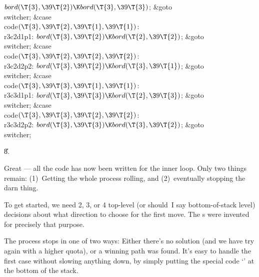 ${}\\{bord}(\T{3},\39\T{2})\K\\{bord}(\T{3},\39\T{3}){}$;\5
\&{goto} \\{switcher};\6
\4\&{case} \\{code}${}(\T{3},\39\T{2},\39\T{1},\39\T{1}){}$:\5
\\{r3c2d1p1}:\5
${}\\{bord}(\T{3},\39\T{2})\K\\{bord}(\T{2},\39\T{2}){}$;\5
\&{goto} \\{switcher};\6
\4\&{case} \\{code}${}(\T{3},\39\T{2},\39\T{2},\39\T{2}){}$:\5
\\{r3c2d2p2}:\5
${}\\{bord}(\T{3},\39\T{2})\K\\{bord}(\T{3},\39\T{1}){}$;\5
\&{goto} \\{switcher};\6
\4\&{case} \\{code}${}(\T{3},\39\T{3},\39\T{1},\39\T{1}){}$:\5
\\{r3c3d1p1}:\5
${}\\{bord}(\T{3},\39\T{3})\K\\{bord}(\T{2},\39\T{3}){}$;\5
\&{goto} \\{switcher};\6
\4\&{case} \\{code}${}(\T{3},\39\T{3},\39\T{2},\39\T{2}){}$:\5
\\{r3c3d2p2}:\5
${}\\{bord}(\T{3},\39\T{3})\K\\{bord}(\T{3},\39\T{2}){}$;\5
\&{goto} \\{switcher};\par
\U8.\fi

Great --- all the code has now been written for
the inner loop.
Only two things remain: (1)~Getting the whole process rolling, and
(2)~eventually stopping the darn thing.

To get started, we need 2, 3, or 4 top-level (or should~I say
bottom-of-stack level) decisions about what direction to choose for the
first move. The s were invented for precisely that purpose.

The process stops in one of two ways: Either there's no solution
(and we have try again with a higher quota), or a winning path was
found. It's easy to handle the first case without slowing anything
down, by simply putting the special code `' at the bottom of the
stack.


